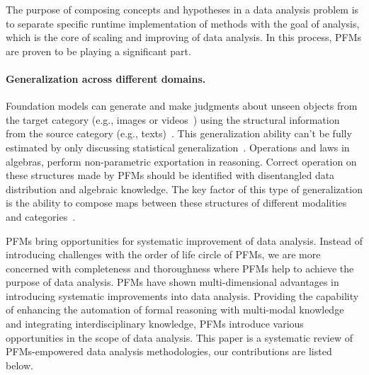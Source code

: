   The purpose of composing concepts and hypotheses in a data analysis problem is to separate specific runtime implementation of methods with the goal of analysis, which is the core of scaling and improving of data analysis. In this process, PFMs are proven to be playing a significant part. 
  
  \paragraph{\textbf{Generalization across different domains.}} Foundation models can generate and make judgments about unseen objects from the target category (e.g., images or videos~\cite{queryvideo}) using the structural information from the source category (e.g., texts)~\cite{Yuan23a}. This generalization ability can't be fully estimated by only discussing statistical generalization~\cite{ReizingerUMKBH24}. Operations and laws in algebras, perform non-parametric exportation in reasoning. Correct operation on these structures made by PFMs should be identified with disentangled data distribution and algebraic knowledge. The key factor of this type of generalization is the ability to compose maps between these structures of different modalities and categories~\cite{DuK24}. 

PFMs bring opportunities for systematic improvement of data analysis. Instead of introducing challenges with the order of life circle of PFMs, we are more concerned with completeness and thoroughness where PFMs help to achieve the purpose of data analysis. PFMs have shown multi-dimensional advantages in introducing systematic improvements into data analysis. Providing the capability of enhancing the automation of formal reasoning with multi-modal knowledge and integrating interdisciplinary knowledge, PFMs introduce various opportunities in the scope of data analysis. This paper is a systematic review of PFMs-empowered data analysis methodologies, our contributions are listed below.
  

